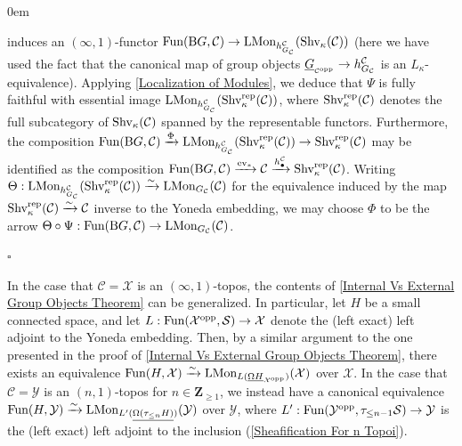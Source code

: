 \documentclass[10pt]{article}
\newcommand{\mS}{\mathcal S}
\newcommand{\C}{\mathcal C}
\newcommand{\cX}{\mathcal{X}}
\newcommand{\cY}{\mathcal{Y}}
\newcommand{\ZZ}{\mathbb{Z}}
\def\ZZ{{\mathbf Z}}
\renewcommand{\qed}{\hfill$\square$}
\renewenvironment{proof}{\begin{addmargin}[1em]{0em}\begin{newproof}}{\end{newproof}\end{addmargin}\qed}
\theoremstyle{witharg}
\theoremstyle{witharg}
\theoremstyle{witharg2}
\begin{document}
\begin{proof}
\noindent induces an $(\infty,1)$-functor $\textnormal{Fun}(\textnormal{B}G,\C)\rightarrow \textnormal{LMon}_{h^\C_{G_\C}}(\textnormal{Shv}_\kappa(\C))$ (here we have used the fact that the canonical map of group objects $\underline{G}_{_{\C^{\textnormal{opp}}}}\rightarrow h^\C_{G_\C}$ is an $L_\kappa$-equivalence). Applying \ref{Localization of Modules}, we deduce that $\Psi$ is fully faithful with essential image $\textnormal{LMon}_{h^\C_{G_\C}}(\textnormal{Shv}^{\textnormal{rep}}_\kappa(\C))$, where $\textnormal{Shv}^{\textnormal{rep}}_\kappa(\C)$ denotes the full subcategory of $\textnormal{Shv}_\kappa(\C)$ spanned by the representable functors. Furthermore, the composition $\textnormal{Fun}(\textnormal{B}G,\C)\xrightarrow{\Phi}\textnormal{LMon}_{h^\C_{G_\C}}(\textnormal{Shv}^{\textnormal{rep}}_\kappa(\C))\rightarrow \textnormal{Shv}^{\textnormal{rep}}_\kappa(\C)$ may be identified as the composition $\textnormal{Fun}(\textnormal{B}G,\C)\xrightarrow{\textnormal{ev}_*}\C\xrightarrow{h_\bullet^\C}\textnormal{Shv}^{\textnormal{rep}}_\kappa(\C)$. Writing $\Theta:\textnormal{LMon}_{h^\C_{G_\C}}(\textnormal{Shv}^{\textnormal{rep}}_\kappa(\C))\xrightarrow{\sim}\textnormal{LMon}_{G_\C}(\C)$ for the equivalence induced by the map $\textnormal{Shv}^{\textnormal{rep}}_\kappa(\C)\xrightarrow{\sim}\C$ inverse to the Yoneda embedding, we may choose $\Phi$ to be the arrow $\Theta\circ \Psi:\textnormal{Fun}(\textnormal{B}G,\C)\rightarrow \textnormal{LMon}_{G_\C}(\C)$.

\end{proof}



\begin{remark}{}\label{Generalization For Groups Internal to N Topoi}

    In the case that $\C=\cX$ is an $(\infty,1)$-topos, the contents of \ref{Internal Vs External Group Objects Theorem} can be generalized. In particular, let $H$ be a small connected space, and let $L:\textnormal{Fun}(\cX^{\textnormal{opp}},\mS)\rightarrow \cX$ denote the (left exact) left adjoint to the Yoneda embedding. Then, by a similar argument to the one presented in the proof of \ref{Internal Vs External Group Objects Theorem}, there exists an equivalence $\textnormal{Fun}(H,\cX)\xrightarrow{\sim}\textnormal{LMon}_{L(\underline{\Omega H}_{\cX^\textnormal{opp}})}(\cX)$ over $\cX$. In the case that $\C=\cY$ is an $(n,1)$-topos for $n\in \ZZ_{\geq 1}$, we instead have a canonical equivalence $\textnormal{Fun}(H,\cY)\xrightarrow{\sim}\textnormal{LMon}_{L^\prime(\underline{\Omega (\tau_{\leq n}H)})}(\cY)$ over $\cY$, where $L^\prime:\textnormal{Fun}(\cY^{\textnormal{opp}},\tau_{\leq n-1}\mS)\rightarrow \cY$ is the (left exact) left adjoint to the inclusion (\ref{Sheafification For n Topoi}).
    
\end{remark}
\end{document}
